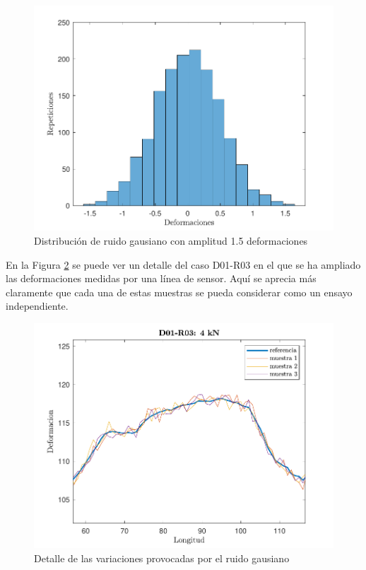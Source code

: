 \begin{figure}[h!]
    \centering
    \includegraphics[width=125mm, angle=0]{3/Fotos/histo_ruido_OBR.pdf}
    \captionsetup{justification=centering,margin=1.25cm}
    \caption{Distribución de ruido gausiano con amplitud 1.5 deformaciones}
    \label{OBRR_ruido}
\end{figure}
    
En la Figura \ref{fig:OBRR_det} se puede ver un detalle del caso D01-R03 en el que se ha ampliado las deformaciones medidas por una línea de sensor. Aquí se aprecia más claramente que cada una de estas muestras se pueda considerar como un ensayo independiente.
    
\begin{figure}[h!]
    \centering
    \includegraphics[width=125mm, angle=0]{3/Fotos/detalle_OBR_ruido.pdf}
    \captionsetup{justification=centering,margin=1.25cm}
    \caption{Detalle de las variaciones provocadas por el ruido gausiano}
    \label{fig:OBRR_det}
\end{figure}
   
